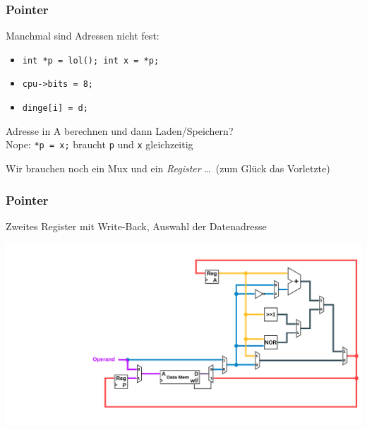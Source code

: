 \documentclass[t,aspectratio=169,usenames,dvipsnames]{beamer}
\begin{document}
\begin{frame}
  \frametitle{Pointer}

  Manchmal sind Adressen nicht fest:
  \begin{itemize}
  \item \texttt{int *p = lol(); int x = *p;}
  \item \texttt{cpu->bits = 8;}
  \item \texttt{dinge[i] = d;}
  \end{itemize}

  \bigskip

  Adresse in A berechnen und dann Laden/Speichern?\\
  Nope: \texttt{*p = x;} braucht \texttt{p} und \texttt{x} gleichzeitig

  \bigskip
  \pause

  Wir brauchen noch ein Mux und ein \emph{Register} \ldots\ (zum Glück das Vorletzte)

\end{frame}

\begin{frame}
  \frametitle{Pointer}

  \strut{}Zweites Register mit Write-Back, Auswahl der Datenadresse

  \begin{center}
    \includegraphics[width=.85\textwidth]{sch-pointer.pdf}
  \end{center}
\end{frame}
\end{document}
